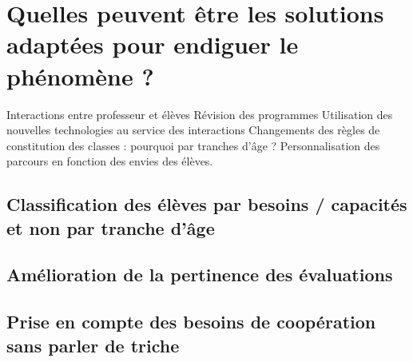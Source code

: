 \section{Quelles peuvent être les solutions adaptées pour endiguer le phénomène ?}\label{solutions}

Interactions entre professeur et élèves
Révision des programmes
Utilisation des nouvelles technologies au service des interactions
Changements des règles de constitution des classes : pourquoi par tranches d'âge ?
Personnalisation des parcours en fonction des envies des élèves.

\subsection{Classification des élèves par besoins / capacités  et non par tranche d'âge}
\subsection{Amélioration de la pertinence des évaluations}
\subsection{Prise en compte des besoins de coopération sans parler de triche}

